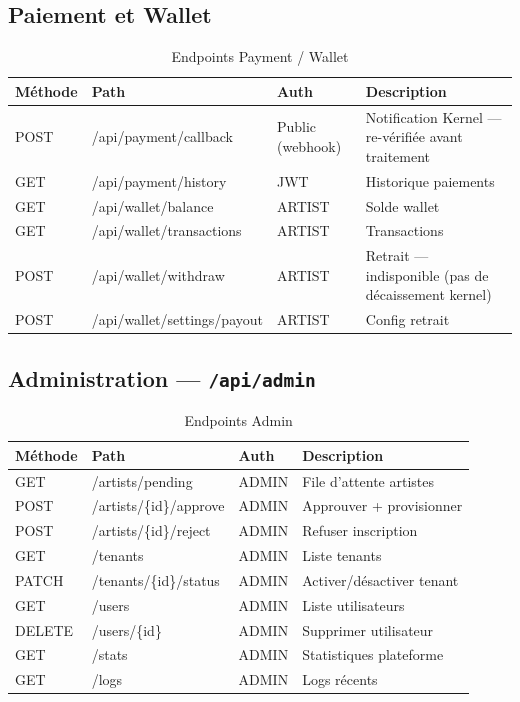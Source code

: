 \subsection{Paiement et Wallet}

\begin{table}[h]
  \centering
  \caption{Endpoints Payment / Wallet}
  \label{tab:api-payment}
  \small
  \begin{tabular}{@{}llll@{}}
    \toprule
    \textbf{Méthode} & \textbf{Path} & \textbf{Auth} & \textbf{Description} \\
    \midrule
    POST & /api/payment/callback       & Public (webhook) & Notification Kernel — re-vérifiée avant traitement \\
    GET  & /api/payment/history        & JWT              & Historique paiements \\
    GET  & /api/wallet/balance         & ARTIST           & Solde wallet \\
    GET  & /api/wallet/transactions    & ARTIST           & Transactions \\
    POST & /api/wallet/withdraw          & ARTIST           & Retrait — indisponible (pas de décaissement kernel) \\
    POST & /api/wallet/settings/payout   & ARTIST           & Config retrait \\
    \bottomrule
  \end{tabular}
\end{table}

\subsection{Administration — \texttt{/api/admin}}

\begin{longtable}{@{}llll@{}}
  \caption{Endpoints Admin} \label{tab:api-admin} \\
  \toprule
  \textbf{Méthode} & \textbf{Path} & \textbf{Auth} & \textbf{Description} \\
  \midrule
  \endfirsthead
  GET    & /artists/pending              & ADMIN & File d'attente artistes \\
  POST   & /artists/\{id\}/approve        & ADMIN & Approuver + provisionner \\
  POST   & /artists/\{id\}/reject         & ADMIN & Refuser inscription \\
  GET    & /tenants                      & ADMIN & Liste tenants \\
  PATCH  & /tenants/\{id\}/status         & ADMIN & Activer/désactiver tenant \\
  GET    & /users                        & ADMIN & Liste utilisateurs \\
  DELETE & /users/\{id\}                  & ADMIN & Supprimer utilisateur \\
  GET    & /stats                        & ADMIN & Statistiques plateforme \\
  GET    & /logs                         & ADMIN & Logs récents \\
  \bottomrule
\end{longtable}

